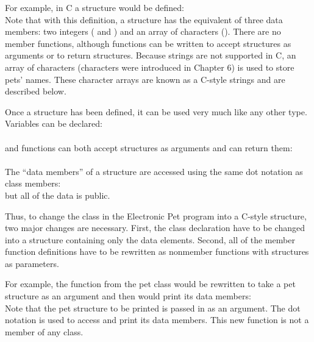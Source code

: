 For example, in C a  structure would be defined:\\
Note that with this definition, a  structure has the equivalent of three data members: two integers ( and ) and an array of characters ().  There are no member functions, although functions can be written to accept structures as arguments or to return structures.   Because strings are not supported in C, an array of characters (characters were introduced in Chapter 6) is used to store pets' names.  These character arrays are known as a C-style strings and are described below.

Once a structure has been defined, it can be used very much like any other type.  Variables can be declared:\\
\\
and functions can both accept structures as arguments and can return them:\\
\\
The ``data members'' of a structure are accessed using the same dot notation as class members:\\
but all of the data is public.

Thus, to change the  class in the Electronic Pet program into a C-style structure, two major changes are necessary.  First, the class declaration have to be changed into a structure containing only the data elements.  Second, all of the member function definitions have to be rewritten as nonmember functions with  structures as parameters.

For example, the  function from the pet class would be rewritten to take a pet structure as an argument and then would print its data members:\\
Note that the pet structure to be printed is passed in as an argument.  The dot notation is used to access and print its data members.  This new  function is not a member of any class.

